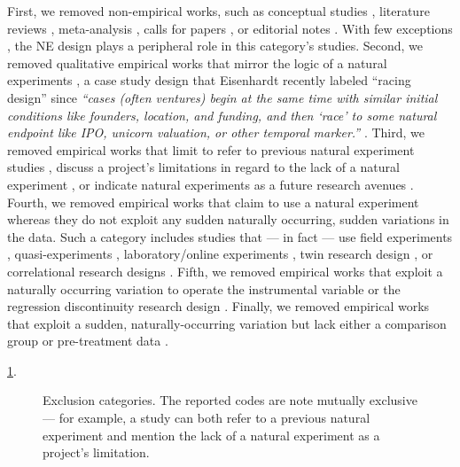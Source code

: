 First, we removed non-empirical works, such as conceptual studies 
\parencite[e.g.,][]{eden2021}, literature reviews
\parencite[e.g.,][]{shaver2020}, meta-analysis
\parencite[e.g.,][]{geyskens2006}, calls for papers
\parencite[e.g.,][]{jacquart2020}, or editorial notes
\parencite[e.g.,][]{breschi2020}. With few exceptions
\parencite[e.g.,][]{sieweke2020}, the NE design plays a peripheral role in this
category's studies. Second, we removed qualitative empirical works that mirror
the logic of a natural experiments \parencite[e.g.,][]{powell2017}, a case study
design that Eisenhardt recently labeled ``racing design'' since \textit{``cases
(often ventures) begin at the same time with similar initial conditions like
founders, location, and funding, and then `race' to some natural endpoint like
IPO, unicorn valuation, or other temporal marker.''} \parencite[page
150,][]{eisenhardt2021}.  Third, we removed empirical works that limit to refer
to previous natural experiment studies \parencite[e.g.,][]{stevens2021}, discuss
a project's limitations in regard to the lack of a natural experiment
\parencite[e.g.,][]{chen2020}, or indicate natural experiments as a future
research avenues \parencite[e.g.,][]{xie0000}.  Fourth, we removed empirical
works that claim to use a natural experiment whereas they do not exploit any
sudden naturally occurring, sudden variations in the data. Such a category
includes studies that --- in fact --- use field experiments
\parencite[e.g.,][]{lee2017}, quasi-experiments
\parencite[e.g.,][]{azoulay2014}, laboratory/online experiments
\parencite[e.g.,][]{laurieromartinez2014}, twin research design
\parencite[e.g.,][]{nicolau2008}, or correlational research designs
\parencite[e.g.,][]{boyle2011}. Fifth, we removed empirical works that exploit a
naturally occurring variation to operate the instrumental variable
\parencite[e.g.,][]{zolotoy2018} or the regression discontinuity research design
\parencite[e.g.,][]{flammer2015}.  Finally, we removed empirical works that
exploit a sudden, naturally-occurring  variation but lack either a comparison
group \parencite[e.g.][]{corbo2016} or pre-treatment data
\parencite[e.g.,][]{desjardine2019}.

\ref{fig:exclusion_causes}. 

\begin{figure}
    \centering
    \sffamily
    \begin{small}
        \begin{center}
            
        \end{center}
        \caption{Exclusion categories. The reported codes are note mutually exclusive
        --- for example, a study can both refer to a previous natural experiment
        and mention the lack of a natural experiment as a project's limitation.}
        \label{fig:exclusion_causes}
    \end{small}
\end{figure}

